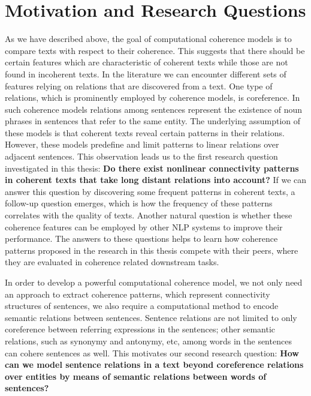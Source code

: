 \section{Motivation and Research Questions}
\label{sec:intro-motivation}

As we have described above, the goal of computational coherence models is to compare texts with respect to their coherence. 
This suggests that there should be certain features which are characteristic of coherent texts while those are not found in incoherent texts. 
In the literature we can encounter different sets of features relying on relations that are discovered from a text. 
One type of relations, which is prominently employed by coherence models, is coreference. 
In such coherence models relations among sentences represent the existence of noun phrases in sentences that refer to the same entity. 
The underlying assumption of these models is that coherent texts reveal certain patterns in their relations. 
However, these models predefine and limit patterns to linear relations over adjacent sentences. 
This observation leads us to the first research question investigated in this thesis: 
\textbf{Do there exist nonlinear connectivity patterns in coherent texts that take long distant relations into account?} 
If we can answer this question by discovering some frequent patterns in coherent texts, a follow-up question emerges, which is how the frequency of these patterns correlates with the quality of texts. 
Another natural question is whether these coherence features can be employed by other NLP systems to improve their performance. 
The answers to these questions helps to learn how coherence patterns proposed in the research in this thesis compete with their peers, where they are evaluated in coherence related downstream tasks. 

In order to develop a powerful computational coherence model, we not only need an approach to extract coherence patterns, which represent connectivity structures of sentences, we also require a computational method to encode semantic relations between sentences. 
Sentence relations are not limited to only coreference between referring expressions in the sentences; other semantic relations, such as synonymy and antonymy, etc, among words in the sentences can cohere sentences as well. 
This motivates our second research question: 
\textbf{How can we model sentence relations in a text beyond coreference relations over entities by means of semantic relations between words of sentences?} 

